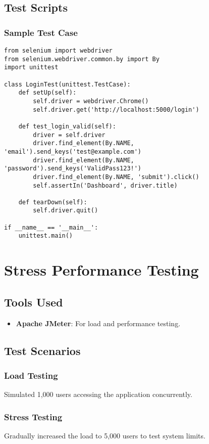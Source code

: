 \documentclass[12pt,a4paper]{report}
\begin{document}
\section{Test Scripts}
\subsection{Sample Test Case}
\begin{lstlisting}[caption=End-to-End Test for User Login]
from selenium import webdriver
from selenium.webdriver.common.by import By
import unittest

class LoginTest(unittest.TestCase):
    def setUp(self):
        self.driver = webdriver.Chrome()
        self.driver.get('http://localhost:5000/login')

    def test_login_valid(self):
        driver = self.driver
        driver.find_element(By.NAME, 'email').send_keys('test@example.com')
        driver.find_element(By.NAME, 'password').send_keys('ValidPass123!')
        driver.find_element(By.NAME, 'submit').click()
        self.assertIn('Dashboard', driver.title)

    def tearDown(self):
        self.driver.quit()

if __name__ == '__main__':
    unittest.main()
\end{lstlisting}

\chapter{Stress Performance Testing}
\section{Tools Used}
\begin{itemize}
    \item \textbf{Apache JMeter}: For load and performance testing.
\end{itemize}

\section{Test Scenarios}
\subsection{Load Testing}
Simulated 1,000 users accessing the application concurrently.

\subsection{Stress Testing}
Gradually increased the load to 5,000 users to test system limits.
\end{document}
